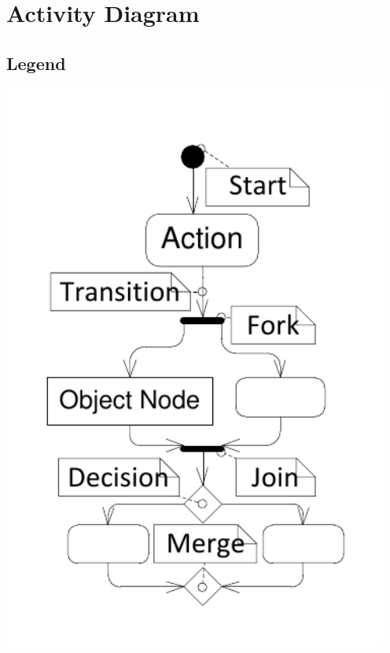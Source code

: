 \documentclass{article}
\begin{document}
\section{Activity Diagram}
\subsection{Legend}
\includegraphics[keepaspectratio, width=5in]{activity_diagram_legend.pdf}\\
\end{document}
